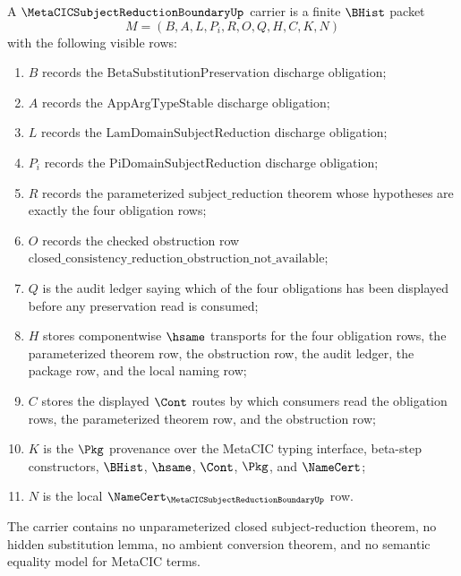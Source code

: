 \begin{definition}
\label{def:metacic-subject-reduction-boundary-carrier}
A $\MetaCICSubjectReductionBoundaryUp$ carrier is a finite $\BHist$ packet
$$
M=(B,A,L,P_i,R,O,Q,H,C,K,N)
$$
with the following visible rows:
\begin{enumerate}
\item $B$ records the $\mathrm{BetaSubstitutionPreservation}$ discharge obligation;
\item $A$ records the $\mathrm{AppArgTypeStable}$ discharge obligation;
\item $L$ records the $\mathrm{LamDomainSubjectReduction}$ discharge obligation;
\item $P_i$ records the $\mathrm{PiDomainSubjectReduction}$ discharge obligation;
\item $R$ records the parameterized $\mathrm{subject\_reduction}$ theorem whose hypotheses are exactly the four obligation rows;
\item $O$ records the checked obstruction row $\mathrm{closed\_consistency\_reduction\_obstruction\_not\_available}$;
\item $Q$ is the audit ledger saying which of the four obligations has been displayed before any preservation read is consumed;
\item $H$ stores componentwise $\hsame$ transports for the four obligation rows, the parameterized theorem row, the obstruction row, the audit ledger, the package row, and the local naming row;
\item $C$ stores the displayed $\Cont$ routes by which consumers read the obligation rows, the parameterized theorem row, and the obstruction row;
\item $K$ is the $\Pkg$ provenance over the MetaCIC typing interface, beta-step constructors, $\BHist$, $\hsame$, $\Cont$, $\Pkg$, and $\NameCert$;
\item $N$ is the local $\NameCert_{\MetaCICSubjectReductionBoundaryUp}$ row.
\end{enumerate}
The carrier contains no unparameterized closed subject-reduction theorem, no hidden substitution lemma, no ambient conversion theorem, and no semantic equality model for MetaCIC terms.
\end{definition}

